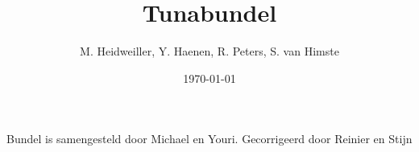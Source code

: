 \documentclass[10pt,a4paper,twoside]{article}
\title{Tunabundel}
\author{M. Heidweiller,  Y. Haenen, R. Peters, S. van Himste}
\date{\today}
\begin{document}
\noindent




Bundel is samengesteld door Michael en Youri. Gecorrigeerd door Reinier en Stijn
\clearpage
\renewcommand\contentsname{Lijst met liedjes.}
\tableofcontents
\vfill
\clearpage

\raggedright
{}


{}
\end{document}
